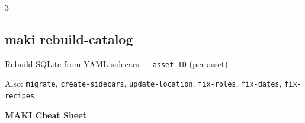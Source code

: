 \documentclass[a4paper,landscape,8pt]{article}
\newcommand{\cmd}[1]{\texttt{\footnotesize #1}}
\newcommand{\opt}[1]{\texttt{\scriptsize\color{maki-stone} #1}}
\begin{document}
\begin{multicols}{3}
\subsection{maki rebuild-catalog}
Rebuild SQLite from YAML sidecars. \opt{--asset ID} (per-asset)

{\color{maki-stone}\scriptsize Also: \cmd{migrate}, \cmd{create-sidecars}, \cmd{update-location}, \cmd{fix-roles}, \cmd{fix-dates}, \cmd{fix-recipes}}

\end{multicols}

\newpage


\begin{center}
{\Large\bfseries\color{maki-salmon} MAKI Cheat Sheet} 
\end{center}
\vspace{-4pt}
\end{document}
